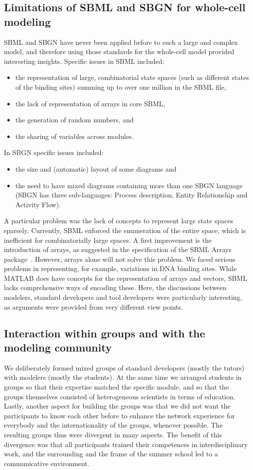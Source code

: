\documentclass[journal,transmag]{IEEEtran}
\begin{document}
\subsection{Limitations of SBML and SBGN for whole-cell modeling}
SBML and SBGN have never been applied before to such a large and complex model, and therefore using those standards for the whole-cell model provided interesting insights. 
Specific issues in SBML included:
\begin{itemize}
\item the representation of large, combinatorial state spaces (such as different states of the binding sites) summing up to over one million in the SBML file, 
\item the lack of representation of arrays in core SBML, 
\item the generation of random numbers, and 
\item the sharing of variables across modules. 
\end{itemize}
In SBGN specific issues included:
\begin{itemize}
\item the size and (automatic) layout of some diagrams and
\item the need to have mixed diagrams containing more than one SBGN language (SBGN has three sub-languages: Process description, Entity Relationship and Activity Flow).
\end{itemize}

A particular problem was the lack of concepts to represent large state spaces sparsely. Currently, SBML enforced the enumeration of the entire space, which is inefficient for combinatorially large spaces. A first improvement is the introduction of arrays, as suggested in the specification of the SBML Arrays package~\cite{SBMLArray}. However, arrays alone will not solve this problem. 
We faced serious problems in representing, for example, variations in DNA binding sites. 
While MATLAB does have concepts for the representation of arrays and vectors, SBML lacks comprehensive ways of encoding these. 
Here, the discussions between modelers, standard developers and tool developers were particularly interesting, as arguments were provided from very different view points.

\subsection{Interaction within groups and with the modeling community} 
We deliberately formed mixed groups of standard developers (mostly the tutors) with modelers (mostly the students). 
At the same time we arranged students in groups so that their expertise matched the specific module, and so that the groups themselves consisted of heterogeneous scientists in terms of education. 
Lastly, another aspect for building the groups was that we did not want the participants to know each other before to enhance the network experience for everybody and the internationality of the groups, whenever possible. 
The resulting groups thus were divergent in many aspects. 
The benefit of this divergence was that all participants trained their competences in interdisciplinary work, and the surrounding and the frame of the summer school led to a communicative environment. 
\end{document}
